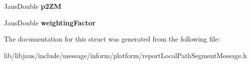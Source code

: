 \begin{DoxyCompactItemize}
\item 
\hypertarget{struct_report_local_path_segment_message_struct_a8dd4f831f2bbaa6e352de6d862a67b29}{\-Jaus\-Double {\bfseries p2\-Z\-M}}\label{struct_report_local_path_segment_message_struct_a8dd4f831f2bbaa6e352de6d862a67b29}

\item 
\hypertarget{struct_report_local_path_segment_message_struct_ab54aff820de839209543f15492533931}{\-Jaus\-Double {\bfseries weighting\-Factor}}\label{struct_report_local_path_segment_message_struct_ab54aff820de839209543f15492533931}

\end{DoxyCompactItemize}


\-The documentation for this struct was generated from the following file\-:\begin{DoxyCompactItemize}
\item 
lib/libjaus/include/message/inform/platform/report\-Local\-Path\-Segment\-Message.\-h\end{DoxyCompactItemize}
